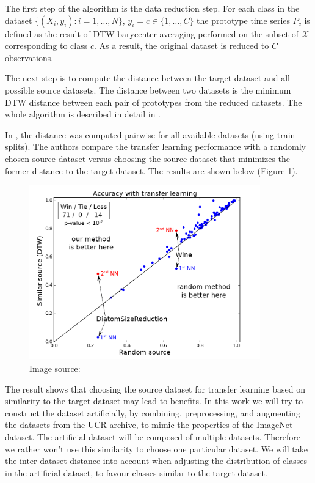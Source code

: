 \documentclass[a4paper,11pt,twoside]{report}
\theoremstyle{definition}
\begin{document}
The first step of the algorithm is the data reduction step. For each class in the dataset $\{(X_i, y_i): i=1, \dots , N\}$, $y_i=c \in \{ 1, \dots, C\}$ the prototype time series $P_c$ is defined as the result of DTW barycenter averaging performed on the subset of $\mathcal{X}$ corresponding to class $c$. As a result, the original dataset is reduced to $C$ observations.


The next step is to compute the distance between the target dataset and all possible source datasets. The distance between two datasets is the minimum DTW distance between each pair of prototypes from the reduced datasets. The whole algorithm is described in detail in \cite{transfer_learning_time_series}.

In \cite{transfer_learning_time_series}, the distance was computed pairwise for all available datasets (using train splits). The authors compare the transfer learning performance with a randomly chosen source dataset versus choosing the source dataset that minimizes the former distance to the target dataset. The results are shown below (Figure \ref{fig:smart_transfer_learning}).
\FloatBarrier


\begin{figure}[h!]
\centering
\includegraphics[width=10cm]{imgs/smart_transfer_learning.png}
\caption{Image source: \cite{transfer_learning_time_series}}
\label{fig:smart_transfer_learning}
\end{figure}
\FloatBarrier

The result shows that choosing the source dataset for transfer learning based on similarity to the target dataset may lead to benefits. In this work we will try to construct the dataset artificially, by combining, preprocessing, and augmenting the datasets from the UCR archive, to mimic the properties of the ImageNet dataset. The artificial dataset will be composed of multiple datasets. Therefore we rather won't use this similarity to choose one particular dataset. We will take the inter-dataset distance into account when adjusting the distribution of classes in the artificial dataset, to favour classes similar to the target dataset.
\end{document}
